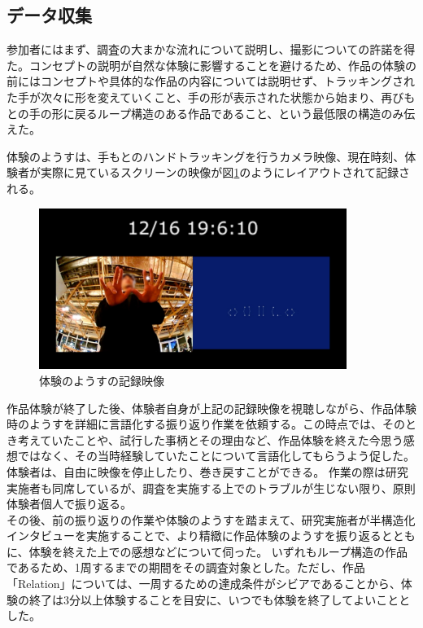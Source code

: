 \subsection{データ収集}
参加者にはまず、調査の大まかな流れについて説明し、撮影についての許諾を得た。コンセプトの説明が自然な体験に影響することを避けるため、作品の体験の前にはコンセプトや具体的な作品の内容については説明せず、トラッキングされた手が次々に形を変えていくこと、手の形が表示された状態から始まり、再びもとの手の形に戻るループ構造のある作品であること、という最低限の構造のみ伝えた。

体験のようすは、手もとのハンドトラッキングを行うカメラ映像、現在時刻、体験者が実際に見ているスクリーンの映像が図\ref{fig:record_monitor}のようにレイアウトされて記録される。

\begin{figure}[H]
  \centering
  \includegraphics[width=10cm]{img/record_monitor.jpg}
  \caption{体験のようすの記録映像}
  \label{fig:record_monitor}
\end{figure}

作品体験が終了した後、体験者自身が上記の記録映像を視聴しながら、作品体験時のようすを詳細に言語化する振り返り作業を依頼する。この時点では、そのとき考えていたことや、試行した事柄とその理由など、作品体験を終えた今思う感想ではなく、その当時経験していたことについて言語化してもらうよう促した。体験者は、自由に映像を停止したり、巻き戻すことができる。
作業の際は研究実施者も同席しているが、調査を実施する上でのトラブルが生じない限り、原則体験者個人で振り返る。\\
その後、前の振り返りの作業や体験のようすを踏まえて、研究実施者が半構造化インタビューを実施することで、より精緻に作品体験のようすを振り返るとともに、体験を終えた上での感想などについて伺った。
いずれもループ構造の作品であるため、1周するまでの期間をその調査対象とした。ただし、作品「Relation」については、一周するための達成条件がシビアであることから、体験の終了は3分以上体験することを目安に、いつでも体験を終了してよいこととした。

